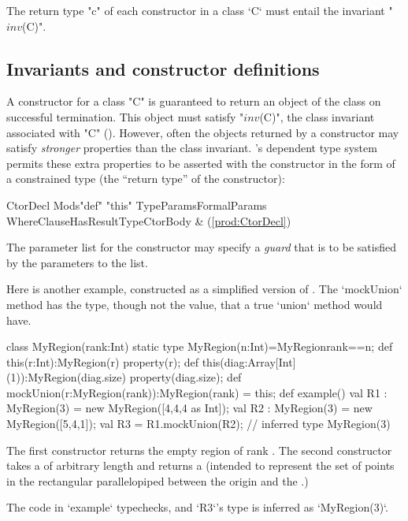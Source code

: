 The return type \xcd"c" of each constructor in a class \xcd`C`
must entail the invariant \xcdmath"$\mathit{inv}$(C)".


\subsection{Invariants and constructor definitions}

A constructor for a class \xcd"C" is guaranteed to return an object of the
class on successful termination. This object must satisfy  \xcdmath"$\mathit{inv}$(C)", the
class invariant associated with \xcd"C" ().
However,
often the objects returned by a constructor may satisfy {\em stronger}
properties than the class invariant. \Xten{}'s dependent type system
permits these extra properties to be asserted with the constructor in
the form of a constrained type (the ``return type'' of the constructor):

\begin{bbgrammar}
            CtorDecl \: Mods\opt \xcd"def" \xcd"this" TypeParams\opt FormalParams WhereClause\opt HasResultType\opt  CtorBody & (\ref{prod:CtorDecl}) \\
\end{bbgrammar}

\label{ConstructorGuard}

The parameter list for the constructor
may specify a \emph{guard} that is to be satisfied by the parameters
to the list.

\begin{ex}
Here is another example, constructed as a simplified 
version of .  The \xcd`mockUnion` method 
has the type, though not the value, that a true \xcd`union` method would have.

\begin{xten}
class MyRegion(rank:Int) {
  static type MyRegion(n:Int)=MyRegion{rank==n};
  def this(r:Int):MyRegion(r) {
    property(r);
  }
  def this(diag:Array[Int](1)):MyRegion(diag.size){ 
    property(diag.size);
  }
  def mockUnion(r:MyRegion(rank)):MyRegion(rank) = this;
  def example() {
    val R1 : MyRegion(3) = new MyRegion([4,4,4 as Int]); 
    val R2 : MyRegion(3) = new MyRegion([5,4,1]); 
    val R3 = R1.mockUnion(R2); // inferred type MyRegion(3)
  }
}
\end{xten}
%
The first constructor returns the empty region of rank .  The
second constructor takes a  of arbitrary length
 and returns a  (intended to represent the set
of points in the rectangular parallelopiped between the origin and the
.)

The code in \xcd`example` typechecks, and \xcd`R3`'s type is inferred as
\xcd`MyRegion(3)`.  


\end{ex}

